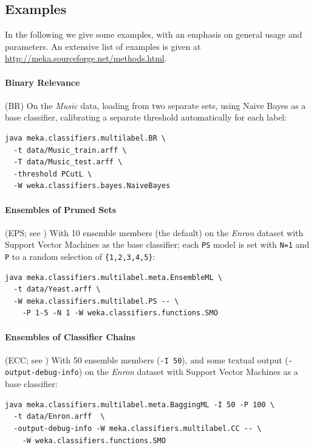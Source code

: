 \documentclass[11pt]{article}
\begin{document}
\subsection{Examples} 

In the following we give some examples, with an emphasis on general usage and parameters. An extensive list of examples is given at \url{http://meka.sourceforge.net/methods.html}. 



\paragraph{Binary Relevance} (BR) On the \textit{Music} data, loading from two separate sets, using Naive Bayes as a base classifier, calibrating a separate threshold automatically for each label: 
\begin{lstlisting}
java meka.classifiers.multilabel.BR \
  -t data/Music_train.arff \
  -T data/Music_test.arff \
  -threshold PCutL \
  -W weka.classifiers.bayes.NaiveBayes
\end{lstlisting}

\paragraph{Ensembles of Pruned Sets} (EPS; see \cite{EPS}) With 10 ensemble members (the default) on the \textit{Enron} dataset with Support Vector Machines as the base classifier; each \texttt{PS} model is set with \texttt{N=1} and \texttt{P} to a random selection of \texttt{\{1,2,3,4,5\}}:

\begin{lstlisting}
java meka.classifiers.multilabel.meta.EnsembleML \
  -t data/Yeast.arff \
  -W meka.classifiers.multilabel.PS -- \
    -P 1-5 -N 1 -W weka.classifiers.functions.SMO
\end{lstlisting}

\paragraph{Ensembles of Classifier Chains} (ECC; see \cite{ECC2}) With 50 ensemble members (\texttt{-I 50}), and some textual output (\texttt{-output-debug-info}) on the \textit{Enron} dataset with Support Vector Machines as a base classifier:
\begin{lstlisting}
java meka.classifiers.multilabel.meta.BaggingML -I 50 -P 100 \
  -t data/Enron.arff  \
  -output-debug-info -W meka.classifiers.multilabel.CC -- \ 
    -W weka.classifiers.functions.SMO
\end{lstlisting}
\end{document}
